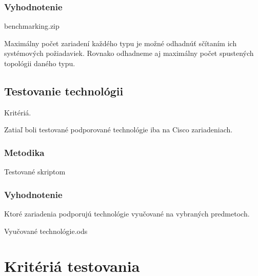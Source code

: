 \subsubsection{Vyhodnotenie}

benchmarking.zip

Maximálny počet zariadení každého typu je možné odhadnúť sčítaním ich systémových požiadaviek. Rovnako odhadneme aj maximálny počet spustených topológii daného typu.

\subsection{Testovanie technológii}

Kritériá.

Zatiaľ boli testované podporované technológie iba na Cisco zariadeniach.

\subsubsection{Metodika}

Testované skriptom

\subsubsection{Vyhodnotenie}

Ktoré zariadenia podporujú technológie vyučované na vybraných predmetoch.

Vyučované technológie.ods

\section{Kritériá testovania}
